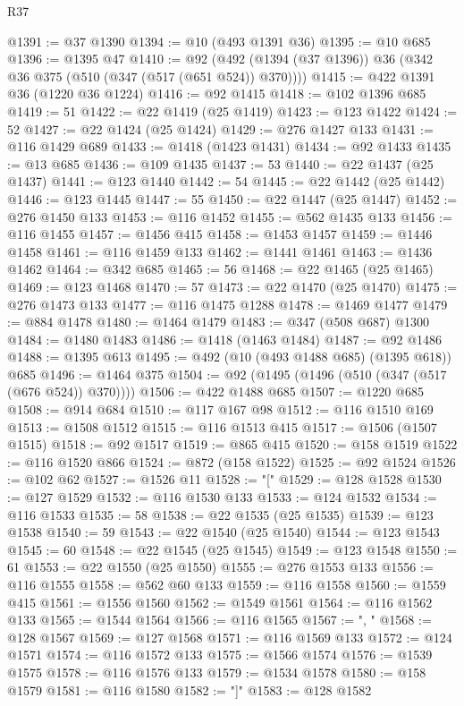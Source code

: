 \begin{lexlean}{R37}
\begin{coremodule}
@1391 := @37 @1390
@1394 := @10 (@493 @1391 @36)
@1395 := @10 @685
@1396 := @1395 @47
@1410 := @92 (@492 (@1394 (@37 @1396)) @36 (@342 @36 @375 (@510 (@347 (@517 (@651 @524)) @370))))
@1415 := @422 @1391 @36 (@1220 @36 @1224)
@1416 := @92 @1415
@1418 := @102 @1396 @685
@1419 := 51
@1422 := @22 @1419 (@25 @1419)
@1423 := @123 @1422
@1424 := 52
@1427 := @22 @1424 (@25 @1424)
@1429 := @276 @1427 @133
@1431 := @116 @1429 @689
@1433 := @1418 (@1423 @1431)
@1434 := @92 @1433
@1435 := @13 @685
@1436 := @109 @1435
@1437 := 53
@1440 := @22 @1437 (@25 @1437)
@1441 := @123 @1440
@1442 := 54
@1445 := @22 @1442 (@25 @1442)
@1446 := @123 @1445
@1447 := 55
@1450 := @22 @1447 (@25 @1447)
@1452 := @276 @1450 @133
@1453 := @116 @1452
@1455 := @562 @1435 @133
@1456 := @116 @1455
@1457 := @1456 @415
@1458 := @1453 @1457
@1459 := @1446 @1458
@1461 := @116 @1459 @133
@1462 := @1441 @1461
@1463 := @1436 @1462
@1464 := @342 @685
@1465 := 56
@1468 := @22 @1465 (@25 @1465)
@1469 := @123 @1468
@1470 := 57
@1473 := @22 @1470 (@25 @1470)
@1475 := @276 @1473 @133
@1477 := @116 @1475 @1288
@1478 := @1469 @1477
@1479 := @884 @1478
@1480 := @1464 @1479
@1483 := @347 (@508 @687) @1300
@1484 := @1480 @1483
@1486 := @1418 (@1463 @1484)
@1487 := @92 @1486
@1488 := @1395 @613
@1495 := @492 (@10 (@493 @1488 @685) (@1395 @618)) @685
@1496 := @1464 @375
@1504 := @92 (@1495 (@1496 (@510 (@347 (@517 (@676 @524)) @370))))
@1506 := @422 @1488 @685
@1507 := @1220 @685
@1508 := @914 @684
@1510 := @117 @167 @98
@1512 := @116 @1510 @169
@1513 := @1508 @1512
@1515 := @116 @1513 @415
@1517 := @1506 (@1507 @1515)
@1518 := @92 @1517
@1519 := @865 @415
@1520 := @158 @1519
@1522 := @116 @1520 @866
@1524 := @872 (@158 @1522)
@1525 := @92 @1524
@1526 := @102 @62
@1527 := @1526 @11
@1528 := "["
@1529 := @128 @1528
@1530 := @127 @1529
@1532 := @116 @1530 @133
@1533 := @124 @1532
@1534 := @116 @1533
@1535 := 58
@1538 := @22 @1535 (@25 @1535)
@1539 := @123 @1538
@1540 := 59
@1543 := @22 @1540 (@25 @1540)
@1544 := @123 @1543
@1545 := 60
@1548 := @22 @1545 (@25 @1545)
@1549 := @123 @1548
@1550 := 61
@1553 := @22 @1550 (@25 @1550)
@1555 := @276 @1553 @133
@1556 := @116 @1555
@1558 := @562 @60 @133
@1559 := @116 @1558
@1560 := @1559 @415
@1561 := @1556 @1560
@1562 := @1549 @1561
@1564 := @116 @1562 @133
@1565 := @1544 @1564
@1566 := @116 @1565
@1567 := ", "
@1568 := @128 @1567
@1569 := @127 @1568
@1571 := @116 @1569 @133
@1572 := @124 @1571
@1574 := @116 @1572 @133
@1575 := @1566 @1574
@1576 := @1539 @1575
@1578 := @116 @1576 @133
@1579 := @1534 @1578
@1580 := @158 @1579
@1581 := @116 @1580
@1582 := "]"
@1583 := @128 @1582

\end{coremodule}
\end{lexlean}
